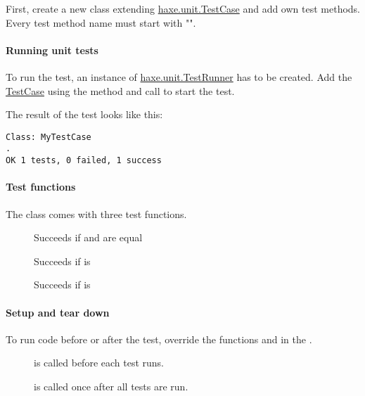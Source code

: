 First, create a new class extending \href{https://api.haxe.org/haxe/unit/TestCase.html}{haxe.unit.TestCase} and add own test methods. Every test method name must start with "".


\paragraph{Running unit tests}
To run the test, an instance of \href{https://api.haxe.org/haxe/unit/TestRunner.html}{haxe.unit.TestRunner} has to be created. Add the \href{https://api.haxe.org/haxe/unit/TestCase.html}{TestCase} using the  method and call  to start the test.


The result of the test looks like this:
\begin{lstlisting}
Class: MyTestCase
.
OK 1 tests, 0 failed, 1 success
\end{lstlisting} 

\paragraph{Test functions}
The  class comes with three test functions.

\begin{description}
	\item[] Succeeds if  and  are equal
	\item[] Succeeds if  is 
	\item[] Succeeds if  is 
\end{description}

\paragraph{Setup and tear down}

To run code before or after the test, override the functions  and  in the . 

\begin{description}
	\item[] is called before each test runs.
	\item[] is called once after all tests are run.
\end{description}

